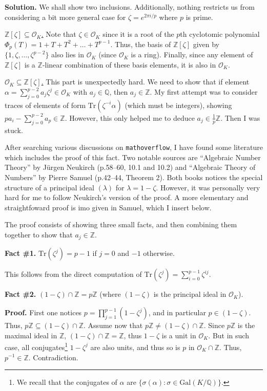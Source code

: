\documentclass{template}
\begin{document}
\textbf{Solution.} We shall show two inclusions. Additionally, nothing restricts
us from considering a bit more general case for $\zeta = e^{2\pi i/p}$ where $p$
is prime.

\underline{$\mathbb{Z}[\zeta] \subseteq \mathcal{O}_K$.} Note that $\zeta \in
\mathcal{O}_K$ since it is a root of the $p$th cyclotomic polynomial $\Phi_p(T)
= 1+T+T^2+\dots+T^{p-1}$. Thus, the basis of $\mathbb{Z}[\zeta]$ given by
$\{1,\zeta,\dots,\zeta^{p-2}\}$ also lies in $\mathcal{O}_K$ (since
$\mathcal{O}_K$ is a ring). Finally, since any element of $\mathbb{Z}[\zeta]$ is
a $\mathbb{Z}$-linear combination of these basis elements, it is also in
$\mathcal{O}_K$.

\underline{$\mathcal{O}_K \subseteq \mathbb{Z}[\zeta]$.} This part is
unexpectedly hard. We need to show that if element $\alpha =
\sum_{j=0}^{p-2}a_j\zeta^j \in \mathcal{O}_K$ with $a_j \in \mathbb{Q}$, then
$a_j \in \mathbb{Z}$. My first attempt was to consider traces of elements of
form $\text{Tr}(\zeta^{-i}\alpha)$ (which must be integers), showing $pa_i -
\sum_{j=0}^{p-2}a_p \in \mathbb{Z}$. However, this only helped me to deduce $a_j
\in \frac{1}{p}\mathbb{Z}$. Then I was stuck.

After searching various discussions on \texttt{mathoverflow}, I have found some
literature which includes the proof of this fact. Two notable sources are
``Algebraic Number Theory'' by Jürgen Neukirch (p.58--60, 10.1 and 10.2) and
``Algebraic Theory of Numbers'' by Pierre Samuel (p.42--44, Theorem 2). Both
books notices the special structure of a principal ideal $(\lambda)$ for
$\lambda=1-\zeta$. However, it was personally very hard for me to follow
Neukirch's version of the proof. A more elementary and straightfoward proof is
imo given in Samuel, which I insert below.

The proof consists of showing three small facts, and then combining them
together to show that $a_j \in \mathbb{Z}$.

\textcolor{blue!70!black}{\textbf{Fact \#1.}} $\text{Tr}(\zeta^j)=p-1$ if $j=0$
and $-1$ otherwise.

This follows from the direct computation of $\text{Tr}(\zeta^j) =
\sum_{i=0}^{p-1}\zeta^{ij}$.

\textcolor{blue!70!black}{\textbf{Fact \#2.}} $(1-\zeta) \cap \mathbb{Z} =
p\mathbb{Z}$ (where $(1-\zeta)$ is the principal ideal in $\mathcal{O}_K$).

\textbf{Proof.} First one notices $p=\prod_{j=1}^{p-1}(1-\zeta^j)$, and in
particular $p \in (1-\zeta)$. Thus, $p\mathbb{Z} \subseteq (1-\zeta) \cap
\mathbb{Z}$. Assume now that $p\mathbb{Z} \neq (1-\zeta) \cap \mathbb{Z}$. Since
$p\mathbb{Z}$ is the maximal ideal in $\mathbb{Z}$, $(1-\zeta) \cap \mathbb{Z} =
\mathbb{Z}$, thus $1-\zeta$ is a unit in $\mathcal{O}_K$. But in such case, all
conjugates\footnote{We recall that the conjugates of $\alpha$ are
$\{\sigma(\alpha): \sigma \in \text{Gal}(K/\mathbb{Q})\}$.} $1-\zeta^j$ are also
units, and thus so is $p$ in $\mathcal{O}_K \cap \mathbb{Z}$. Thus, $p^{-1} \in
\mathbb{Z}$. Contradiction.
\end{document}
